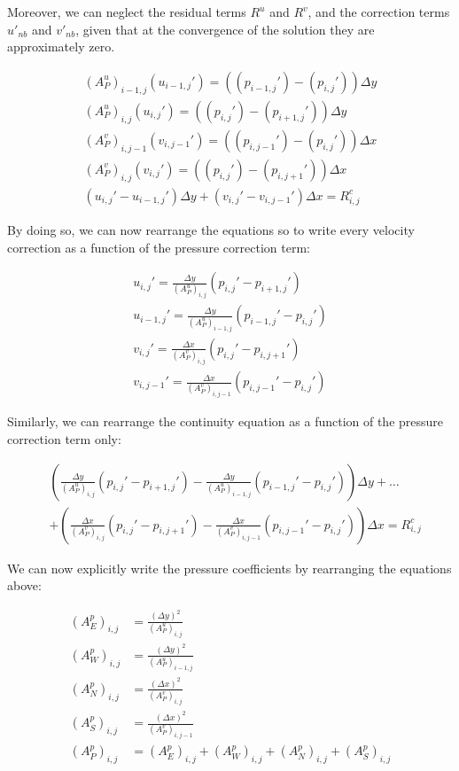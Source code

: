 Moreover, we can neglect the residual terms $R^u$ and $R^v$, and the correction terms $u'_{nb}$ and $v'_{nb}$, given that at the convergence of the solution they are approximately zero.

\begin{gather}
    (A_P^u)_{i-1,j} (u_{i-1,j}') = ((p_{i-1,j}') - (p_{i,j}')) \Delta y \\
    (A_P^u)_{i,j}   (u_{i,j}')   = ((p_{i,j}') - (p_{i+1,j}')) \Delta y \\
    (A_P^v)_{i,j-1} (v_{i,j-1}') = ((p_{i,j-1}') - (p_{i,j}')) \Delta x \\
    (A_P^v)_{i,j}   (v_{i,j}')   = ((p_{i,j}') - (p_{i,j+1}')) \Delta x \\
    (u_{i,j}' - u_{i-1,j}') \Delta y + (v_{i,j}' - v_{i,j-1}') \Delta x = R^c_{i,j}
\end{gather}

By doing so, we can now rearrange the equations so to write every velocity correction as a function of the pressure correction term:

\begin{gather}
    u_{i,j}' = \frac{\Delta y}{(A_P^u)_{i,j}} (p_{i,j}' - p_{i+1,j}') \\
    u_{i-1,j}' = \frac{\Delta y}{(A_P^u)_{i-1,j}} (p_{i-1,j}' - p_{i,j}') \\
    v_{i,j}' = \frac{\Delta x}{(A_P^v)_{i,j}} (p_{i,j}' - p_{i,j+1}') \\
    v_{i,j-1}' = \frac{\Delta x}{(A_P^v)_{i,j-1}} (p_{i,j-1}' - p_{i,j}')
\end{gather}

Similarly, we can rearrange the continuity equation as a function of the pressure correction term only:

\begin{align}
     & \left(\frac{\Delta y}{(A_P^u)_{i,j}} (p_{i,j}' - p_{i+1,j}') - \frac{\Delta y}{(A_P^u)_{i-1,j}} (p_{i-1,j}' - p_{i,j}')\right) \Delta y + \dots       \\
     & + \left(\frac{\Delta x}{(A_P^v)_{i,j}} (p_{i,j}' - p_{i,j+1}') - \frac{\Delta x}{(A_P^v)_{i,j-1}} (p_{i,j-1}' - p_{i,j}')\right) \Delta x = R^c_{i,j}
\end{align}

We can now explicitly write the pressure coefficients by rearranging the equations above:

\begin{align}
    (A_E^p)_{i,j} & = \frac{(\Delta y)^2}{(A_P^u)_{i,j}}                            \\
    (A_W^p)_{i,j} & = \frac{(\Delta y)^2}{(A_P^u)_{i-1,j}}                          \\
    (A_N^p)_{i,j} & = \frac{(\Delta x)^2}{(A_P^v)_{i,j}}                            \\
    (A_S^p)_{i,j} & = \frac{(\Delta x)^2}{(A_P^v)_{i,j-1}}                          \\
    (A_P^p)_{i,j} & = (A_E^p)_{i,j} + (A_W^p)_{i,j} + (A_N^p)_{i,j} + (A_S^p)_{i,j}
    \label{eq:SIMPLE_pressure_coefficients}
\end{align}

